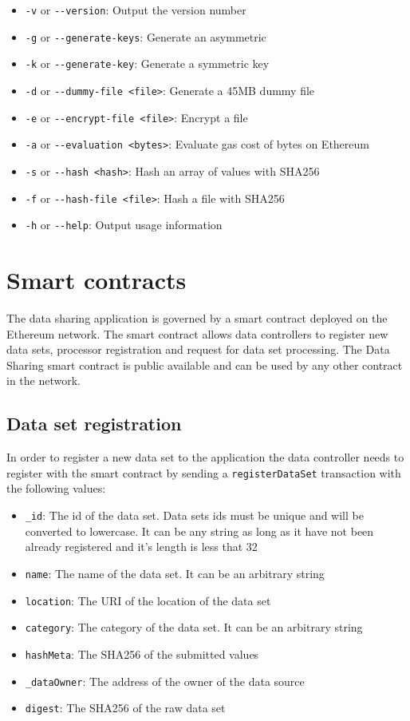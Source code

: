\begin{itemize}
  \item \verb|-v| or \verb|--version|: Output the version number
  \item \verb|-g| or \verb|--generate-keys|: Generate an asymmetric
  \item \verb|-k| or \verb|--generate-key|: Generate a symmetric key
  \item \verb|-d| or \verb|--dummy-file <file>|: Generate a 45MB dummy file
  \item \verb|-e| or \verb|--encrypt-file <file>|: Encrypt a file
  \item \verb|-a| or \verb|--evaluation <bytes>|: Evaluate gas cost of bytes on Ethereum
  \item \verb|-s| or \verb|--hash <hash>|: Hash an array of values with SHA256
  \item \verb|-f| or \verb|--hash-file <file>|: Hash a file with SHA256
  \item \verb|-h| or \verb|--help|: Output usage information
\end{itemize}

\section{Smart contracts}
\label{implemenation:contracts}

The data sharing application is governed by a smart contract deployed on the Ethereum network. The smart contract allows data controllers to register new data sets, processor registration and request for data set processing. The Data Sharing smart contract is public available and can be used by any other contract in the network.

\subsection{Data set registration}
\label{implemenation:contracts:data_reg}

In order to register a new data set to the application the data controller needs to register with the smart contract by sending a \verb|registerDataSet| transaction with the following values:

\begin{itemize}
  \item \verb|_id|: The id of the data set. Data sets ids must be unique and will be converted to lowercase. It can be any string as long as it have not been already registered and it's length is less that 32
  \item \verb|name|: The name of the data set. It can be an arbitrary string
  \item \verb|location|: The URI of the location of the data set
  \item \verb|category|: The category of the data set. It can be an arbitrary string
  \item \verb|hashMeta|: The SHA256 of the submitted values
  \item \verb|_dataOwner|: The address of the owner of the data source
  \item \verb|digest|: The SHA256 of the raw data set
\end{itemize}

